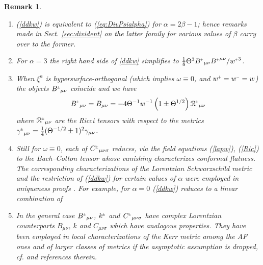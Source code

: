 \documentclass[a4paper,11pt,reqno]{amsart}
\newcommand{\cR}{\mathcal{R}}
\newcommand{\Th}{\Theta}
\newcommand{\al}{\alpha}
\newcommand{\si}{\sigma}
\theoremstyle{plain}
\newtheorem{remark}[thm]{Remark}
\renewcommand{\P}[1]{{{#1}^{\hspace{-.5pt}\scaleto{+}{4pt}}}}
\newcommand{\M}[1]{{{#1}^{\hspace{-.5pt}\scaleto{-}{4pt}}}}
\newcommand{\PM}[1]{{{#1}^{\hspace{-.5pt}\scaleto{\pm}{3.5pt}}}}
\numberwithin{equation}{section}
\begin{document}
\begin{remark}
\label{divrem}~
\begin{enumerate} 
\item (\ref{ddkw}) is equivalent to (\ref{eq:DivPsialpha}) for $\alpha = 2\beta - 1$; 
hence remarks made in Sect. \ref{sec:divident} on the latter family for various values of $\beta$ carry over  to the former.

%

%
%

%

\item
For $\al = 3$ the right hand side of \eqref{ddkw} simplifies to 
$\frac{1}{8} \Theta^{3}  \PM{B}_{\mu\nu} \PM{B}^{\mu\nu} / \PM{w}^{3}$.

\item When $\xi^{a}$ is hypersurface-orthogonal (which implies $\omega \equiv 0$, and $\P{w} = \M{w} = w$) the objects  $\PM{B}_{\mu\nu}$ coincide and we have
\begin{equation} 
 \PM{B}_{\mu\nu} = B_{\mu\nu} = - 4 \Th^{-1} w^{-1} \left (1 \pm \Th^{1/2} \right) \PM{\cR}_{\mu\nu} 
 \end{equation}
where $\PM{\cR}_{\mu\nu}$ are  the Ricci tensors with respect to the metrics 
 $\PM{\gamma}_{\mu\nu}  =  \frac{1}{4} (\Th^{- 1/2} \pm 1)^2 \gamma_{\mu\nu}$.
\item 
Still  for $\omega \equiv 0$,  each of $\PM{C}_{\mu\nu\si}$ reduces, via the field equations (\ref{lapw}), (\ref{Ric})  to the Bach--Cotton tensor whose vanishing characterizes conformal flatness.
The corresponding characterizations of the Lorentzian  Schwarzschild metric
and the restriction of (\ref{ddkw}) for certain values of $\al$  were 
employed in uniqueness proofs \cite{1967PhRv..164.1776I,MR398432}. For example, for $\al =0$  (\ref{ddkw}) reduces  to a linear combination of  \cite[Eq. (2.12)-(2.13)]{MR398432} 


\item
 In the general case
$\PM{B}_{\mu\nu}$, $\PM{k}$ and $\PM{C}_{\mu\nu\si}$  have complex Lorentzian
counterparts $B_{\mu\nu}$, $k$ and $C_{\mu\nu\si}$ which have analogous properties.
 They have been employed in local characterizations of the Kerr metric among the AF
 ones \cite{MR747036} and of  larger classes of metrics if the asymptotic  assumption is dropped, cf.  \cite{nozawa2021alternative} and references therein. 
\end{enumerate} 

\end{remark}
\end{document}
